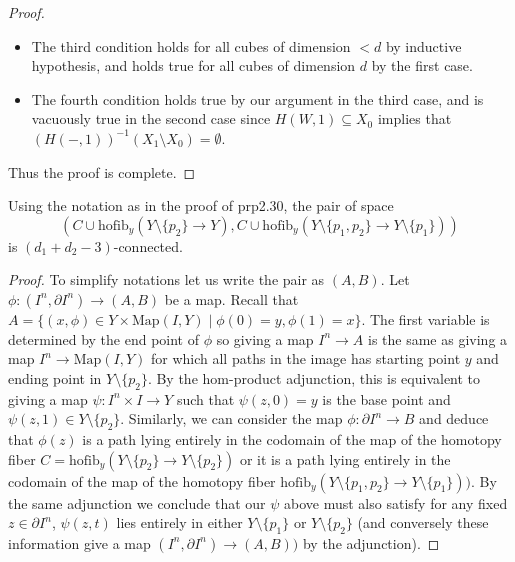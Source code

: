\begin{lmm}{}{}
\begin{proof}
\begin{itemize}
\item The third condition holds for all cubes of dimension $<d$ by inductive hypothesis, and holds true for all cubes of dimension $d$ by the first case. 
\item The fourth condition holds true by our argument in the third case, and is vacuously true in the second case since $H(W,1)\subseteq X_0$ implies that $(H(-,1))^{-1}(X_1\setminus X_0)=\emptyset$. 
\end{itemize}
Thus the proof is complete. 
\end{proof}
\end{lmm}

\begin{lmm}{}{} Using the notation as in the proof of prp2.30, the pair of space $$(C\cup \text{hofib}_y(Y\setminus\{p_2\}\to Y),C\cup\text{hofib}_y(Y\setminus\{p_1,p_2\}\to Y\setminus\{p_1\}))$$ is $(d_1+d_2-3)$-connected. 
\begin{proof}
To simplify notations let us write the pair as $(A,B)$. Let $\phi:(I^n,\partial I^n)\to(A,B)$ be a map. Recall that $A=\{(x,\phi)\in Y\times\text{Map}(I,Y)\;|\;\phi(0)=y,\phi(1)=x\}$. The first variable is determined by the end point of $\phi$ so giving a map $I^n\to A$ is the same as giving a map $I^n\to\text{Map}(I,Y)$ for which all paths in the image has starting point $y$ and ending point in $Y\setminus\{p_2\}$. By the hom-product adjunction, this is equivalent to giving a map $\psi:I^n\times I\to Y$ such that $\psi(z,0)=y$ is the base point and $\psi(z,1)\in Y\setminus\{p_2\}$. Similarly, we can consider the map $\phi:\partial I^n\to B$ and deduce that $\phi(z)$ is a path lying entirely in the codomain of the map of the homotopy fiber $C=\text{hofib}_y(Y\setminus\{p_2\}\to Y\setminus\{p_2\})$ or it is a path lying entirely in the codomain of the map of the homotopy fiber $\text{hofib}_y(Y\setminus\{p_1,p_2\}\to Y\setminus\{p_1\}))$. By the same adjunction we conclude that our $\psi$ above must also satisfy for any fixed $z\in\partial I^n$, $\psi(z,t)$ lies entirely in either $Y\setminus\{p_1\}$ or $Y\setminus\{p_2\}$ (and conversely these information give a map $(I^n,\partial I^n)\to(A,B))$ by the adjunction).  


\end{proof}
\end{lmm}

